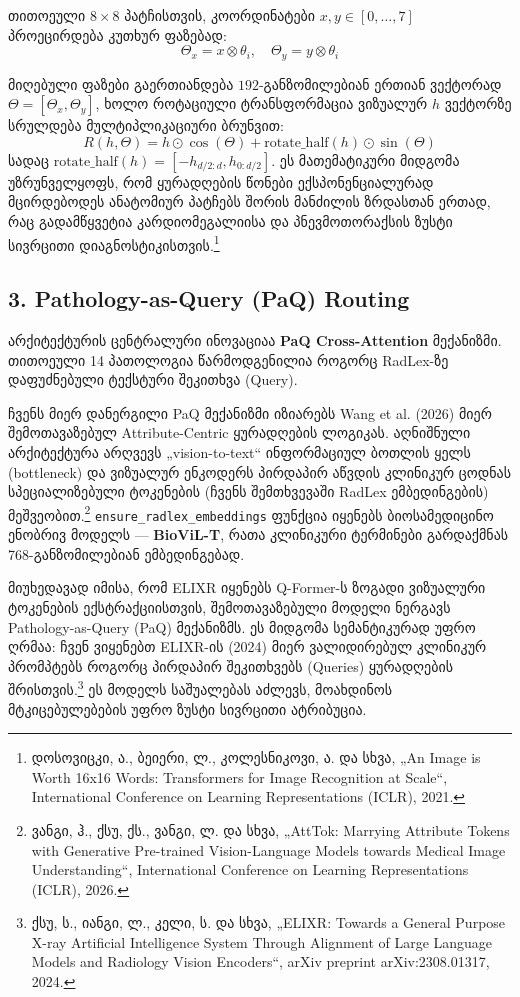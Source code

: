 \documentclass[12pt,a4paper,oneside]{report}
\begin{document}
თითოეული $8 \times 8$ პატჩისთვის, კოორდინატები $x, y \in [0, \dots, 7]$ პროეცირდება კუთხურ ფაზებად:
\begin{equation}
\Theta_x = x \otimes \theta_i, \quad \Theta_y = y \otimes \theta_i
\end{equation}

\pagebreak %
მიღებული ფაზები გაერთიანდება $192$-განზომილებიან ერთიან ვექტორად $\Theta = [\Theta_x, \Theta_y]$, ხოლო როტაციული ტრანსფორმაცია ვიზუალურ $h$ ვექტორზე სრულდება მულტიპლიკაციური ბრუნვით:
\begin{equation}
R(h, \Theta) = h \odot \cos(\Theta) + \text{rotate\_half}(h) \odot \sin(\Theta)
\end{equation}
სადაც $\text{rotate\_half}(h) = [-h_{d/2:d}, h_{0:d/2}]$. ეს მათემატიკური მიდგომა უზრუნველყოფს, რომ ყურადღების წონები ექსპონენციალურად მცირდებოდეს ანატომიურ პატჩებს შორის მანძილის ზრდასთან ერთად, რაც გადამწყვეტია კარდიომეგალიისა და პნევმოთორაქსის ზუსტი სივრცითი დიაგნოსტიკისთვის.\footnote{დოსოვიცკი, ა., ბეიერი, ლ., კოლესნიკოვი, ა. და სხვა, „An Image is Worth 16x16 Words: Transformers for Image Recognition at Scale“, International Conference on Learning Representations (ICLR), 2021.}

\subsection{3. Pathology-as-Query (PaQ) Routing}
არქიტექტურის ცენტრალური ინოვაციაა \textbf{PaQ Cross-Attention} მექანიზმი. თითოეული 14 პათოლოგია წარმოდგენილია როგორც RadLex-ზე დაფუძნებული ტექსტური შეკითხვა (Query). 

ჩვენს მიერ დანერგილი PaQ მექანიზმი იზიარებს Wang et al. (2026) მიერ შემოთავაზებულ Attribute-Centric ყურადღების ლოგიკას. აღნიშნული არქიტექტურა არღვევს „vision-to-text“ ინფორმაციულ ბოთლის ყელს (bottleneck) და ვიზუალურ ენკოდერს პირდაპირ აწვდის კლინიკურ ცოდნას სპეციალიზებული ტოკენების (ჩვენს შემთხვევაში RadLex ემბედინგების) მეშვეობით.\footnote{ვანგი, ჰ., ქსუ, ქს., ვანგი, ლ. და სხვა, „AttTok: Marrying Attribute Tokens with Generative Pre-trained Vision-Language Models towards Medical Image Understanding“, International Conference on Learning Representations (ICLR), 2026.} \texttt{ensure\_radlex\_embeddings} ფუნქცია იყენებს ბიოსამედიცინო ენობრივ მოდელს — \textbf{BioViL-T}, რათა კლინიკური ტერმინები გარდაქმნას 768-განზომილებიან ემბედინგებად.

მიუხედავად იმისა, რომ ELIXR იყენებს Q-Former-ს ზოგადი ვიზუალური ტოკენების ექსტრაქციისთვის, შემოთავაზებული მოდელი ნერგავს Pathology-as-Query (PaQ) მექანიზმს. ეს მიდგომა სემანტიკურად უფრო ღრმაა: ჩვენ ვიყენებთ ELIXR-ის (2024) მიერ ვალიდირებულ კლინიკურ პრომპტებს როგორც პირდაპირ შეკითხვებს (Queries) ყურადღების შრისთვის.\footnote{ქსუ, ს., იანგი, ლ., კელი, ს. და სხვა, „ELIXR: Towards a General Purpose X-ray Artificial Intelligence System Through Alignment of Large Language Models and Radiology Vision Encoders“, arXiv preprint arXiv:2308.01317, 2024.} ეს მოდელს საშუალებას აძლევს, მოახდინოს მტკიცებულებების უფრო ზუსტი სივრცითი ატრიბუცია.
\end{document}
